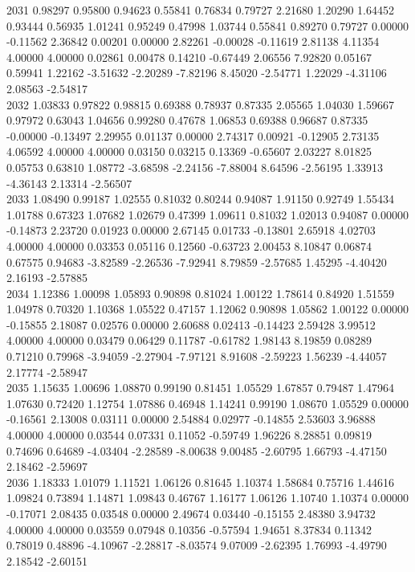 {2031 0.98297 0.95800 0.94623 0.55841 0.76834 0.79727 2.21680 1.20290 1.64452 0.93444 0.56935 1.01241 0.95249 0.47998 1.03744 0.55841 0.89270 0.79727 0.00000 -0.11562 2.36842 0.00201 0.00000 2.82261 -0.00028 -0.11619 2.81138 4.11354 4.00000 4.00000 0.02861 0.00478 0.14210 -0.67449 2.06556 7.92820 0.05167 0.59941 1.22162 -3.51632 -2.20289 -7.82196 8.45020 -2.54771 1.22029 -4.31106 2.08563 -2.54817 \\
2032 1.03833 0.97822 0.98815 0.69388 0.78937 0.87335 2.05565 1.04030 1.59667 0.97972 0.63043 1.04656 0.99280 0.47678 1.06853 0.69388 0.96687 0.87335 -0.00000 -0.13497 2.29955 0.01137 0.00000 2.74317 0.00921 -0.12905 2.73135 4.06592 4.00000 4.00000 0.03150 0.03215 0.13369 -0.65607 2.03227 8.01825 0.05753 0.63810 1.08772 -3.68598 -2.24156 -7.88004 8.64596 -2.56195 1.33913 -4.36143 2.13314 -2.56507 \\
2033 1.08490 0.99187 1.02555 0.81032 0.80244 0.94087 1.91150 0.92749 1.55434 1.01788 0.67323 1.07682 1.02679 0.47399 1.09611 0.81032 1.02013 0.94087 0.00000 -0.14873 2.23720 0.01923 0.00000 2.67145 0.01733 -0.13801 2.65918 4.02703 4.00000 4.00000 0.03353 0.05116 0.12560 -0.63723 2.00453 8.10847 0.06874 0.67575 0.94683 -3.82589 -2.26536 -7.92941 8.79859 -2.57685 1.45295 -4.40420 2.16193 -2.57885 \\
2034 1.12386 1.00098 1.05893 0.90898 0.81024 1.00122 1.78614 0.84920 1.51559 1.04978 0.70320 1.10368 1.05522 0.47157 1.12062 0.90898 1.05862 1.00122 0.00000 -0.15855 2.18087 0.02576 0.00000 2.60688 0.02413 -0.14423 2.59428 3.99512 4.00000 4.00000 0.03479 0.06429 0.11787 -0.61782 1.98143 8.19859 0.08289 0.71210 0.79968 -3.94059 -2.27904 -7.97121 8.91608 -2.59223 1.56239 -4.44057 2.17774 -2.58947 \\
2035 1.15635 1.00696 1.08870 0.99190 0.81451 1.05529 1.67857 0.79487 1.47964 1.07630 0.72420 1.12754 1.07886 0.46948 1.14241 0.99190 1.08670 1.05529 0.00000 -0.16561 2.13008 0.03111 0.00000 2.54884 0.02977 -0.14855 2.53603 3.96888 4.00000 4.00000 0.03544 0.07331 0.11052 -0.59749 1.96226 8.28851 0.09819 0.74696 0.64689 -4.03404 -2.28589 -8.00638 9.00485 -2.60795 1.66793 -4.47150 2.18462 -2.59697 \\
2036 1.18333 1.01079 1.11521 1.06126 0.81645 1.10374 1.58684 0.75716 1.44616 1.09824 0.73894 1.14871 1.09843 0.46767 1.16177 1.06126 1.10740 1.10374 0.00000 -0.17071 2.08435 0.03548 0.00000 2.49674 0.03440 -0.15155 2.48380 3.94732 4.00000 4.00000 0.03559 0.07948 0.10356 -0.57594 1.94651 8.37834 0.11342 0.78019 0.48896 -4.10967 -2.28817 -8.03574 9.07009 -2.62395 1.76993 -4.49790 2.18542 -2.60151 \\
}

